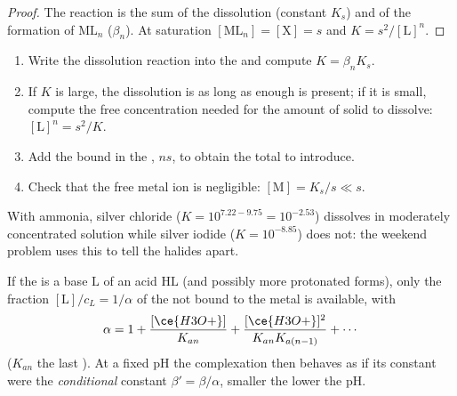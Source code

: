 \begin{proof}
The reaction is the sum of the dissolution (constant $K_s$) and of the
formation of $\mathrm{ML}_n$ ($\beta_n$). At saturation $[\mathrm{ML}_n]
= [\mathrm{X}] = s$ and $K = s^2/[\mathrm{L}]^n$.
\end{proof}

\begin{method}\label{met:b1:complexation:dissolve-precipitate}
\begin{enumerate}
  \item Write the dissolution reaction into the  and compute
        $K = \beta_n K_s$.
  \item If $K$ is large, the dissolution is  as long as
        enough  is present; if it is small, compute the free 
        concentration needed for the amount of solid to dissolve:
        $[\mathrm{L}]^n = s^2/K$.
  \item Add the  bound in the , $n s$, to obtain the total
         to introduce.
  \item Check that the free metal ion is negligible: $[\mathrm{M}] = K_s/s
        \ll s$.
\end{enumerate}
\end{method}

With ammonia, silver chloride ($K = 10^{7.22 - 9.75} = 10^{-2.53}$)
dissolves in moderately concentrated solution while silver iodide
($K = 10^{-8.85}$) does not: the weekend problem uses this to tell the
halides apart.

\begin{proposition}\label{prop:b1:complexation:ligand-acidity}
If the  is a base $\mathrm{L}$ of an acid $\mathrm{HL}$ (and
possibly more protonated forms), only the fraction $[\mathrm{L}]/c_L =
1/\alpha$ of the  not bound to the metal is available, with
\[
  \alpha = 1 + \frac{[\ce{H3O+}]}{K_{an}} + \frac{[\ce{H3O+}]^2}{K_{an}K_{a(n-1)}}
  + \cdots
\]
($K_{an}$ the last ). At a fixed pH the complexation then
behaves as if its constant were the \emph{conditional} constant
$\beta' = \beta/\alpha$, smaller the lower the pH.
\end{proposition}

